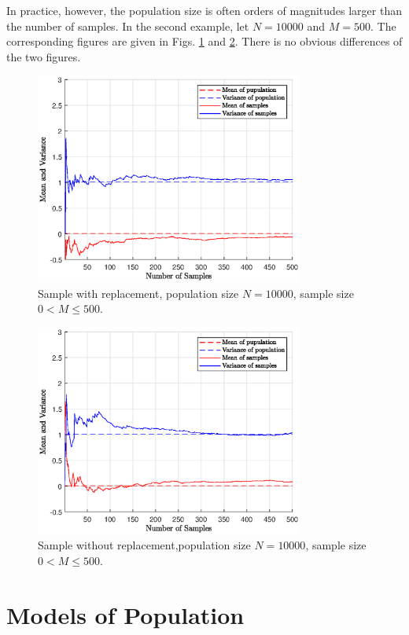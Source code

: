 In practice, however, the population size is often orders of magnitudes larger than the number of samples. In the second example, let $N=10000$ and $M=500$. The corresponding figures are given in Figs. \ref{ch:sampling:fig:sample-wr-n10000} and \ref{ch:sampling:fig:sample-nwr-n10000}. There is no obvious differences of the two figures.

\begin{figure}
	\centering
	\includegraphics[width=250pt]{chapters/ch-sampling/figures/sample-wr-n10000.eps}
	\caption{Sample with replacement, population size $N=10000$, sample size $0< M\leq500$.} \label{ch:sampling:fig:sample-wr-n10000}
\end{figure}

\begin{figure}
	\centering
	\includegraphics[width=250pt]{chapters/ch-sampling/figures/sample-nwr-n10000.eps}
	\caption{Sample without replacement,population size $N=10000$, sample size $0< M\leq500$.} \label{ch:sampling:fig:sample-nwr-n10000}
\end{figure}

\section{Models of Population}

